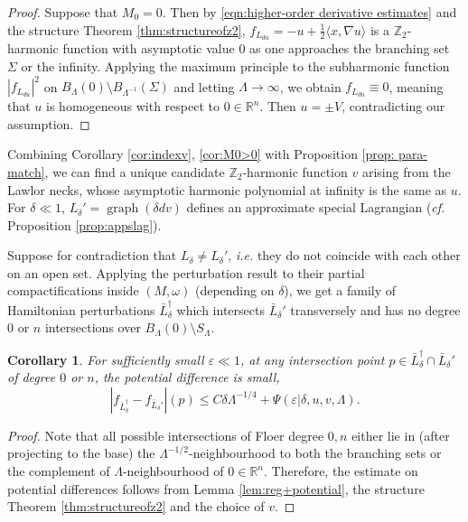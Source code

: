 \documentclass[11pt,a4paper]{article}
\numberwithin{equation}{section}%
\newtheorem{cor}[thm]{Corollary}
\theoremstyle{definition}
\newcommand{\ie}{\emph{i.e.} }
\newcommand{\cf}{\emph{cf.} }
\newcommand{\R}{\mathbb{R}}
\newcommand{\Z}{\mathbb{Z}}
\begin{document}
\begin{proof}
Suppose that $M_0=0$. Then by \eqref{eqn:higher-order derivative estimates} and the structure Theorem \ref{thm:structureofz2}, 
$f_{L_{du}}=-u+\frac{1}{2}\langle x,\nabla u\rangle$ is a $\Z_2$-harmonic function with asymptotic value $0$ as one approaches the branching set $\Sigma$ or the infinity. Applying the maximum principle to the subharmonic function $|f_{L_{du}}|^2$ on $B_{\Lambda}(0)\setminus B_{\Lambda^{-1}}(\Sigma)$ and letting $\Lambda \to \infty$, we obtain $f_{L_{du}}\equiv 0$, meaning that $u$ is homogeneous with respect to $0\in \R^n$. Then $u=\pm V$, contradicting our assumption.   
\end{proof}

Combining Corollary \ref{cor:indexv}, \ref{cor:M0>0} with Proposition \ref{prop: para-match}, we can find a unique candidate $\Z_2$-harmonic function $v$ arising from the Lawlor necks, whose asymptotic harmonic polynomial at infinity is the same as $u$. For $\delta\ll 1$, $L_\delta'=\operatorname{graph}(\delta dv)$ defines an approximate special Lagrangian (\cf Proposition \ref{prop:appslag}). 

Suppose for contradiction that $L_{\delta }\neq L_{\delta }'$, \ie they do not coincide with each other on an open set. Applying the perturbation result to their partial compactifications inside $(M,\omega)$ (depending on $\delta$), we get a family of Hamiltonian perturbations
$\bar L_{\delta}^{\dagger}$ which intersects $\bar L_{\delta}'$ transversely and has no degree $0$ or $n$ intersections over $B_{\Lambda}(0)\setminus S_{\Lambda}$. 

\begin{cor}
\label{cor:potentialdiffsmallest}
    For sufficiently small $\varepsilon\ll 1$, at any intersection point $p\in \bar L_\delta^\dagger\cap \bar L_\delta'$ of degree $0$ or $n$, the potential difference is small,
    \begin{equation*}
        |f_{\bar L_\delta^{\dagger}}-f_{\bar L_\delta'}|(p)\leqslant C\delta \Lambda^{-1/4}+\Psi(\varepsilon|\delta,u,v,\Lambda).
    \end{equation*}
    
\end{cor}
\begin{proof}
    Note that all possible intersections of Floer degree $0,n$ either lie in (after projecting to the base) the $\Lambda^{-1/2}$-neighbourhood to both the branching sets or the complement of $\Lambda$-neighbourhood of $0\in \R^n$. Therefore, the estimate on potential differences follows from Lemma \ref{lem:reg+potential}, the structure Theorem \ref{thm:structureofz2} and the choice of $v$. 
\end{proof}
\end{document}
